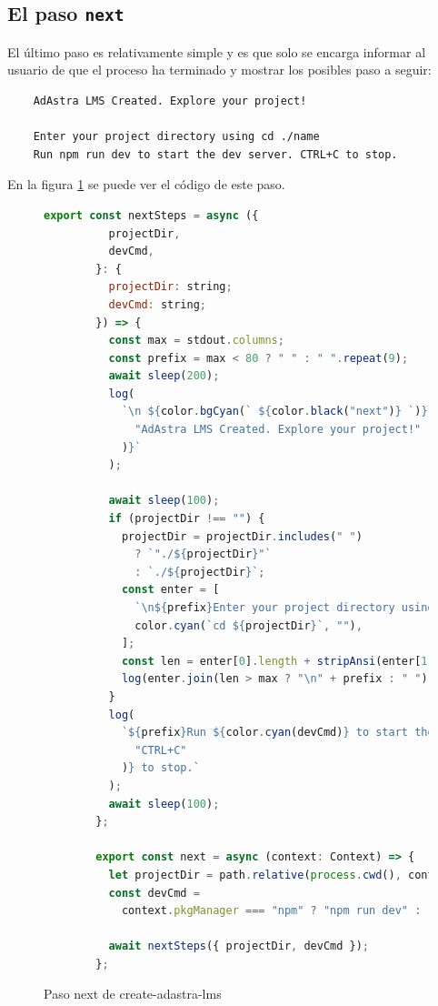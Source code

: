\subsection{El paso {\tt next}}

El último paso es relativamente simple y es que solo se encarga informar al usuario de que el proceso ha terminado y mostrar los posibles paso a seguir:
\begin{verbatim}
    AdAstra LMS Created. Explore your project!

    Enter your project directory using cd ./name
    Run npm run dev to start the dev server. CTRL+C to stop.
\end{verbatim}

En la figura \ref{fig:adastraCreateNext} se puede ver el código de este paso.

\begin{figure}
    \begin{lstlisting}[language=Javascript]
        export const nextSteps = async ({
          projectDir,
          devCmd,
        }: {
          projectDir: string;
          devCmd: string;
        }) => {
          const max = stdout.columns;
          const prefix = max < 80 ? " " : " ".repeat(9);
          await sleep(200);
          log(
            `\n ${color.bgCyan(` ${color.black("next")} `)}  ${color.bold(
              "AdAstra LMS Created. Explore your project!"
            )}`
          );
        
          await sleep(100);
          if (projectDir !== "") {
            projectDir = projectDir.includes(" ")
              ? `"./${projectDir}"`
              : `./${projectDir}`;
            const enter = [
              `\n${prefix}Enter your project directory using`,
              color.cyan(`cd ${projectDir}`, ""),
            ];
            const len = enter[0].length + stripAnsi(enter[1]).length;
            log(enter.join(len > max ? "\n" + prefix : " "));
          }
          log(
            `${prefix}Run ${color.cyan(devCmd)} to start the dev server. ${color.cyan(
              "CTRL+C"
            )} to stop.`
          );
          await sleep(100);
        };
        
        export const next = async (context: Context) => {
          let projectDir = path.relative(process.cwd(), context.cwd);
          const devCmd =
            context.pkgManager === "npm" ? "npm run dev" : `${context.pkgManager} dev`;
        
          await nextSteps({ projectDir, devCmd });
        };
    \end{lstlisting}
    \caption{Paso next de create-adastra-lms}
    \label{fig:adastraCreateNext}
\end{figure}

